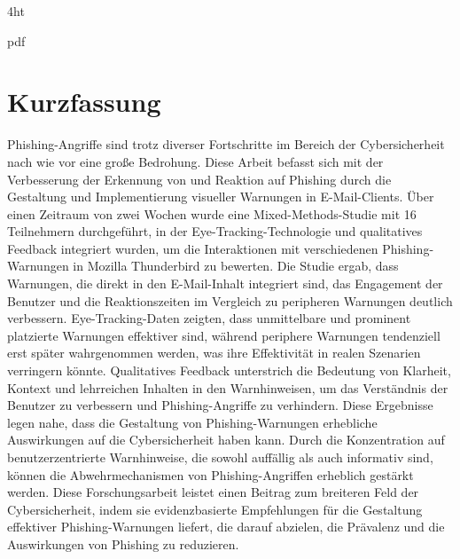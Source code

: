 \documentclass[
  a4paper,  %
  twoside,  %
  bibliography=totoc,
  headsepline,
  cleardoublepage=empty,
  parskip=half,
  draft=false
]{scrbook}
\begin{document}
\iftex4ht
  \Configure{$}{\PicMath}{\EndPicMath}{}

  {pdf}
  {%
  }
\fi



\Coverpage
\Copyright
\pagestyle{preamble}
\renewcommand*{\chapterpagestyle}{preamble}



\section*{Kurzfassung}
Phishing-Angriffe sind trotz diverser Fortschritte im Bereich der Cybersicherheit nach wie vor eine große Bedrohung. Diese Arbeit befasst sich mit der Verbesserung der Erkennung von und Reaktion auf Phishing durch die Gestaltung und Implementierung visueller Warnungen in E-Mail-Clients. Über einen Zeitraum von zwei Wochen wurde eine Mixed-Methods-Studie mit 16 Teilnehmern durchgeführt, in der Eye-Tracking-Technologie und qualitatives Feedback integriert wurden, um die Interaktionen mit verschiedenen Phishing-Warnungen in Mozilla Thunderbird zu bewerten. \newline
Die Studie ergab, dass Warnungen, die direkt in den E-Mail-Inhalt integriert sind, das Engagement der Benutzer und die Reaktionszeiten im Vergleich zu peripheren Warnungen deutlich verbessern. Eye-Tracking-Daten zeigten, dass unmittelbare und prominent platzierte Warnungen effektiver sind, während periphere Warnungen tendenziell erst später wahrgenommen werden, was ihre Effektivität in realen Szenarien verringern könnte. Qualitatives Feedback unterstrich die Bedeutung von Klarheit, Kontext und lehrreichen Inhalten in den Warnhinweisen, um das Verständnis der Benutzer zu verbessern und Phishing-Angriffe zu verhindern. \newline
Diese Ergebnisse legen nahe, dass die Gestaltung von Phishing-Warnungen erhebliche Auswirkungen auf die Cybersicherheit haben kann. Durch die Konzentration auf benutzerzentrierte Warnhinweise, die sowohl auffällig als auch informativ sind, können die Abwehrmechanismen von Phishing-Angriffen erheblich gestärkt werden. Diese Forschungsarbeit leistet einen Beitrag zum breiteren Feld der Cybersicherheit, indem sie evidenzbasierte Empfehlungen für die Gestaltung effektiver Phishing-Warnungen liefert, die darauf abzielen, die Prävalenz und die Auswirkungen von Phishing zu reduzieren. 
\end{document}
